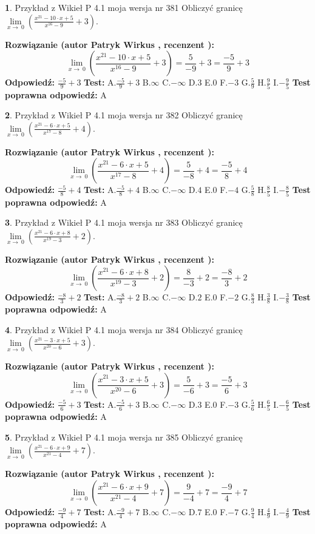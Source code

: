 \documentclass[12pt, a4paper]{article}
\theoremstyle{definition} %
\newtheorem{zad}{}
\newcommand{\zadStart}[1]{\begin{zad}#1\newline}
\newcommand{\zadStop}{\end{zad}}
\newcommand{\rozwStart}[2]{\noindent \textbf{Rozwiązanie (autor #1 , recenzent #2): }\newline}
\newcommand{\rozwStop}{\newline}
\newcommand{\odpStart}{\noindent \textbf{Odpowiedź:}\newline}
\newcommand{\odpStop}{\newline}
\newcommand{\testStart}{\noindent \textbf{Test:}\newline}
\newcommand{\testStop}{\newline}
\newcommand{\kluczStart}{\noindent \textbf{Test poprawna odpowiedź:}\newline}
\newcommand{\kluczStop}{\newline}
\begin{document}
\zadStart{Przykład z Wikieł P 4.1 moja wersja nr 381}
Obliczyć granicę $\lim\limits_{x\to\ 0}(\frac{x^{21}-10 \cdot x +5}{x^{16}-9}+3)$.
\zadStop
\rozwStart{Patryk Wirkus}{}
$$\lim\limits_{x\to\ 0}(\frac{x^{21}-10 \cdot x +5}{x^{16}-9}+3)=\frac{5}{-9}+3=\frac{-5}{9}+3$$
\rozwStop
\odpStart
$\frac{-5}{9}+3$
\odpStop
\testStart
A.$\frac{-5}{9}+3$
B.$\infty$
C.$-\infty$
D.$3$
E.$0$
F.$-3$
G.$\frac{5}{9}$
H.$\frac{9}{5}$
I.$-\frac{9}{5}$
\testStop
\kluczStart
A
\kluczStop



\zadStart{Przykład z Wikieł P 4.1 moja wersja nr 382}
Obliczyć granicę $\lim\limits_{x\to\ 0}(\frac{x^{21}-6 \cdot x +5}{x^{17}-8}+4)$.
\zadStop
\rozwStart{Patryk Wirkus}{}
$$\lim\limits_{x\to\ 0}(\frac{x^{21}-6 \cdot x +5}{x^{17}-8}+4)=\frac{5}{-8}+4=\frac{-5}{8}+4$$
\rozwStop
\odpStart
$\frac{-5}{8}+4$
\odpStop
\testStart
A.$\frac{-5}{8}+4$
B.$\infty$
C.$-\infty$
D.$4$
E.$0$
F.$-4$
G.$\frac{5}{8}$
H.$\frac{8}{5}$
I.$-\frac{8}{5}$
\testStop
\kluczStart
A
\kluczStop



\zadStart{Przykład z Wikieł P 4.1 moja wersja nr 383}
Obliczyć granicę $\lim\limits_{x\to\ 0}(\frac{x^{21}-6 \cdot x +8}{x^{19}-3}+2)$.
\zadStop
\rozwStart{Patryk Wirkus}{}
$$\lim\limits_{x\to\ 0}(\frac{x^{21}-6 \cdot x +8}{x^{19}-3}+2)=\frac{8}{-3}+2=\frac{-8}{3}+2$$
\rozwStop
\odpStart
$\frac{-8}{3}+2$
\odpStop
\testStart
A.$\frac{-8}{3}+2$
B.$\infty$
C.$-\infty$
D.$2$
E.$0$
F.$-2$
G.$\frac{8}{3}$
H.$\frac{3}{8}$
I.$-\frac{3}{8}$
\testStop
\kluczStart
A
\kluczStop



\zadStart{Przykład z Wikieł P 4.1 moja wersja nr 384}
Obliczyć granicę $\lim\limits_{x\to\ 0}(\frac{x^{21}-3 \cdot x +5}{x^{20}-6}+3)$.
\zadStop
\rozwStart{Patryk Wirkus}{}
$$\lim\limits_{x\to\ 0}(\frac{x^{21}-3 \cdot x +5}{x^{20}-6}+3)=\frac{5}{-6}+3=\frac{-5}{6}+3$$
\rozwStop
\odpStart
$\frac{-5}{6}+3$
\odpStop
\testStart
A.$\frac{-5}{6}+3$
B.$\infty$
C.$-\infty$
D.$3$
E.$0$
F.$-3$
G.$\frac{5}{6}$
H.$\frac{6}{5}$
I.$-\frac{6}{5}$
\testStop
\kluczStart
A
\kluczStop



\zadStart{Przykład z Wikieł P 4.1 moja wersja nr 385}
Obliczyć granicę $\lim\limits_{x\to\ 0}(\frac{x^{21}-6 \cdot x +9}{x^{21}-4}+7)$.
\zadStop
\rozwStart{Patryk Wirkus}{}
$$\lim\limits_{x\to\ 0}(\frac{x^{21}-6 \cdot x +9}{x^{21}-4}+7)=\frac{9}{-4}+7=\frac{-9}{4}+7$$
\rozwStop
\odpStart
$\frac{-9}{4}+7$
\odpStop
\testStart
A.$\frac{-9}{4}+7$
B.$\infty$
C.$-\infty$
D.$7$
E.$0$
F.$-7$
G.$\frac{9}{4}$
H.$\frac{4}{9}$
I.$-\frac{4}{9}$
\testStop
\kluczStart
A
\kluczStop
\end{document}

